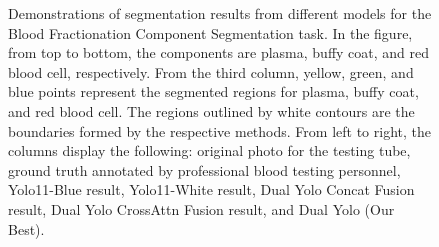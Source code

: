 \documentclass[journal,twoside,web]{ieeecolor}
\begin{document}
\begin{figure}[!t]
\noindent
{}\hspace{\sepSa}%
\hspace{\sepLa}%
\hspace{\sepSa}%
\hspace{\sepSa}%
%
%
%

\caption{Demonstrations of segmentation results from different models for the Blood Fractionation Component Segmentation task. In the figure, from top to bottom, the components are plasma, buffy coat, and red blood cell, respectively. From the third column, yellow, green, and blue points represent the segmented regions for plasma, buffy coat, and red blood cell. The regions outlined by white contours are the boundaries formed by the respective methods. From left to right, the columns display the following: original photo for the testing tube, ground truth annotated by professional blood testing personnel, Yolo11-Blue result, Yolo11-White result, Dual Yolo Concat Fusion result, Dual Yolo CrossAttn Fusion result, and Dual Yolo (Our Best).}
\label{fig:evaluation-grid-7}
\end{figure}
\end{document}
